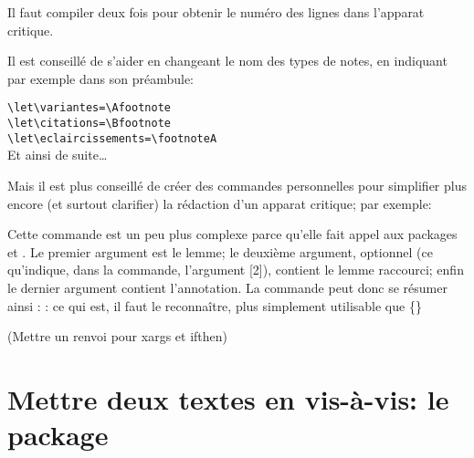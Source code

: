 \begin{attention}
Il faut compiler deux fois pour obtenir le numéro des lignes dans l'apparat critique.
\end{attention}



Il est conseillé de s'aider en changeant le nom des types de notes, en indiquant par exemple dans son préambule: 

\noindent \verb|\let\variantes=\Afootnote| \\
\verb|\let\citations=\Bfootnote| \\
\verb|\let\eclaircissements=\footnoteA| \\
Et ainsi de suite\dots 

Mais il est plus conseillé de créer des commandes personnelles pour simplifier plus encore  (et surtout clarifier) la rédaction d'un apparat critique; par exemple:

\begin{latexcode*}
\usepackage{ifthen, xargs}
\end{latexcode*}

Cette commande est un peu plus complexe parce qu'elle fait appel aux packages  et . Le premier argument est le lemme; le deuxième argument, optionnel (ce qu'indique, dans la commande, l'argument [2]), contient le lemme raccourci; enfin le dernier argument contient l'annotation. La commande peut donc se résumer ainsi :  : ce qui est, il faut le reconnaître, plus simplement utilisable que \{\}


(Mettre un renvoi pour xargs et ifthen)

 






\section{Mettre deux textes en vis-à-vis: le package }



